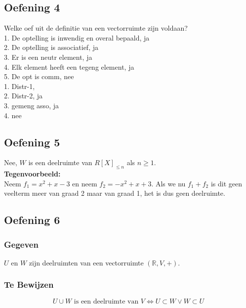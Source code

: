 \documentclass[lineaire_algebra_oplossingen.tex]{subfiles}
\begin{document}
\subsection{Oefening 4}
Welke oef uit de definitie van een vectorruimte zijn voldaan? \\
1. De optelling is inwendig en overal bepaald, ja \\
2. De optelling is associatief,	ja \\
3. Er is een neutr element, ja \\
4. Elk element heeft een tegeng element, ja \\
5. De opt is comm, nee \\

1. Distr-1, \\
2. Distr-2, ja \\
3. gemeng asso, ja\\
4. nee

\subsection{Oefening 5}
Nee, $W$ is een deelruimte van $R[X]_{\le n}$ als $n\ge 1$.\\
\textbf{Tegenvoorbeeld: }\\Neem $f_1=x^2+x-3$ en neem $f_2=-x^2+x+3$.
Als we nu $f_1+f_2$ is dit geen veelterm meer van graad 2 maar van graad 1, het is dus geen deelruimte.
\cite{Tijl}



\subsection{Oefening 6}
\subsubsection*{Gegeven}
$U$ en $W$ zijn deelruimten van een vectorruimte $(\mathbb{R},V,+)$.
\subsubsection*{Te Bewijzen}
\[
U \cup W \text{ is een deelruimte van }V \Leftrightarrow U \subset W \vee W \subset U
\]
\end{document}
